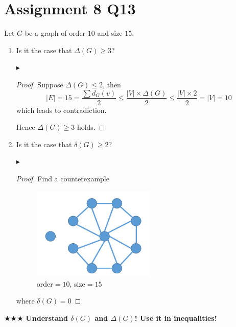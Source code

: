 \section*{Assignment 8 Q13}
Let $G$ be a graph of order $10$ and size $15$.
\begin{enumerate}
    \item Is it the case that $\Delta(G) \geq 3$?
    
    $\blacktriangleright$ \begin{proof}
    Suppose $\Delta(G)\leq2$, then $$|E|=15=\frac{\sum d_G(v)}{2}\leq\frac{|V|\times \Delta(G)}{2}\leq\frac{|V|\times2}{2}=|V|=10$$
    which leads to contradiction.
    
    Hence $\Delta(G)\geq3$ holds.
    \end{proof}
    \item Is it the case that $\delta(G) \geq 2$?
    
    $\blacktriangleright$\begin{proof}
    Find a counterexample 
    \begin{figure}[h]
        \centering
        \includegraphics[width=0.55\textwidth]{example.png}
        \caption{order$=10$, size$=15$}
        \label{fig:example}
    \end{figure}
    where $\delta(G)=0$
    \end{proof}
\end{enumerate}
$\bigstar\bigstar\bigstar$ \textbf{Understand $\delta(G)$ and $\Delta(G)$! Use it in inequalities!}
